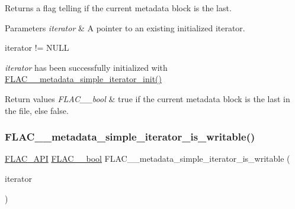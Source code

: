 Returns a flag telling if the current metadata block is the last.


\begin{DoxyParams}{Parameters}
{\em iterator} & A pointer to an existing initialized iterator.  
\begin{DoxyCode}
iterator != NULL 
\end{DoxyCode}
 {\itshape iterator} has been successfully initialized with \hyperlink{group__flac__metadata__level1_ga2a055cca4e6e06ae62517c8b0fa6e8a3}{F\+L\+A\+C\+\_\+\+\_\+metadata\+\_\+simple\+\_\+iterator\+\_\+init()} \\
\hline
\end{DoxyParams}

\begin{DoxyRetVals}{Return values}
{\em F\+L\+A\+C\+\_\+\+\_\+bool} & {\ttfamily true} if the current metadata block is the last in the file, else {\ttfamily false}. \\
\hline
\end{DoxyRetVals}
\mbox{\label{group__flac__metadata__level1_gadc654c1361b53737bab20efa3e75a0fc}} 
\subsubsection{\texorpdfstring{F\+L\+A\+C\+\_\+\+\_\+metadata\+\_\+simple\+\_\+iterator\+\_\+is\+\_\+writable()}{FLAC\_\_metadata\_simple\_iterator\_is\_writable()}}
{\footnotesize\ttfamily \hyperlink{group__flac__export_ga56ca07df8a23310707732b1c0007d6f5}{F\+L\+A\+C\+\_\+\+A\+PI} \hyperlink{ordinals_8h_a95103469f1cbd78b8cf250194985b34e}{F\+L\+A\+C\+\_\+\+\_\+bool} F\+L\+A\+C\+\_\+\+\_\+metadata\+\_\+simple\+\_\+iterator\+\_\+is\+\_\+writable (\begin{DoxyParamCaption}\item[{\hyperlink{zconf_8h_a2c212835823e3c54a8ab6d95c652660e}{const} \hyperlink{group__flac__metadata__level1_ga6accccddbb867dfc2eece9ee3ffecb3a}{F\+L\+A\+C\+\_\+\+\_\+\+Metadata\+\_\+\+Simple\+Iterator} $\ast$}]{iterator }\end{DoxyParamCaption})}


